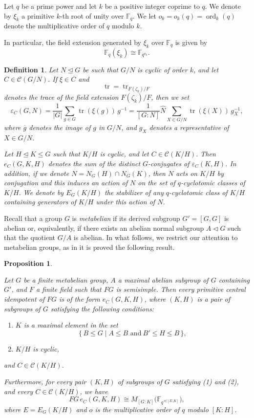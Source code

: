 \documentclass{article}
\newtheorem{proposition}[theorem]{Proposition}
\newtheorem{definition}{Definition}
\begin{document}
Let $q$ be a prime power and let $k$ be a positive integer coprime to $q$. We denote by $\xi_k$ a primitive $k$-th root of unity over $\mathbb{F}_q$. We let $o_k = o_k(q) = \operatorname{ord}_k(q)$ denote the multiplicative order of $q$ modulo $k$.

In particular, the field extension generated by $\xi_k$ over $\mathbb{F}_q$ is given by
\[
  \mathbb{F}_q(\xi_k) \cong \mathbb{F}_{q^{o_k}}.
\]

\begin{definition}
Let $N \trianglelefteq G$ be such that $G/N$ is cyclic of order $k$, and let
$C \in \mathcal{C}(G/N)$. If $\xi \in C$ and
\[
\operatorname{tr}=\operatorname{tr}_{F(\zeta_k)/F}
\]
denotes the trace of the field extension $F(\zeta_k)/F$, then we set
\[
\varepsilon_C(G,N)
=
\frac{1}{|G|}
\sum_{g\in G}
\operatorname{tr}(\xi(g))\,g^{-1}
=
\frac{1}{[G:N]}
\widehat{N}
\sum_{X\in G/N}
\operatorname{tr}(\xi(X))\,g_X^{-1},
\]
where $\overline{g}$ denotes the image of $g$ in $G/N$, and $g_X$ denotes a
representative of $X\in G/N$.

Let $H \trianglelefteq K \leq G$ such that $K/H$ is cyclic, and let
$C \in \mathcal{C}(K/H)$. Then $e_C(G,K,H)$ denotes the sum of the distinct
$G$-conjugates of $\varepsilon_C(K,H)$. In addition, if we denote $N = N_G(H) \cap N_G(K)$, then $N$ acts on $K/H$ by conjugation and this induces an action of $N$ on the set of $q$-cyclotomic classes of $K/H$. We denote by $E_G(K/H)$ the 
stabilizer of any $q$-cyclotomic class of $K/H$ containing generators 
of $K/H$ under this action of $N$.
\end{definition}

Recall that a group $G$ is \emph{metabelian} if its derived subgroup $G' = [G,G]$ is abelian or, equivalently, if there exists an abelian normal subgroup $A \triangleleft G$ such that the quotient $G/A$ is abelian. In what follows, we restrict our attention to metabelian groups, as in \cite{BROCHE200771} it is proved the following result. 
\begin{proposition} \label{metabelian}
    
Let $G$ be a finite metabelian group, $A$ a maximal abelian subgroup of $G$ containing $G'$, and $F$ a finite field such that $FG$ is semisimple. Then every primitive central idempotent of $FG$ is of the form $e_C(G,K,H)$, where $(K,H)$ is a pair of subgroups of $G$ satisfying the following conditions:

\begin{enumerate}
\item $K$ is a maximal element in the set
\[
\{\, B \leq G \mid A \leq  B  \text{ and}\ B' \leq H \leq B \,\},
\]

\item $K/H$ is cyclic,
\end{enumerate}

and $C \in \mathcal{C}(K/H)$.

Furthermore, for every pair $(K,H)$ of subgroups of $G$ satisfying (1) and (2), and every $C \in \mathcal{C}(K/H)$, we have
\[
FG\, e_C(G,K,H) \cong M_{[G:K]}\big( \mathbb{F}_{q^{\,o/[E:K]}} \big),
\]
where $E = E_G(K/H)$ and $o$ is the multiplicative order of $q$ modulo $[K:H]$.
\end{proposition}
\end{document}
